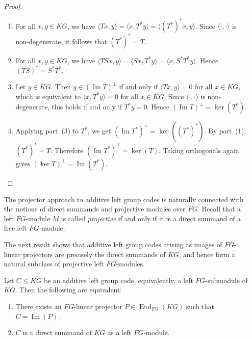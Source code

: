 \documentclass[11pt]{article}
\begin{document}
\begin{proof}
\begin{enumerate}
    \item For all $x,y\in KG$, we have $\langle Tx,y\rangle=\langle x,T^\ast y\rangle=\langle (T^\ast)^\ast x,y\rangle$. Since $\langle\cdot,\cdot\rangle$ is non-degenerate, it follows that $(T^\ast)^\ast=T$.

    \item For all $x,y\in KG$, we have
    $\langle TSx,y\rangle=\langle Sx,T^\ast y\rangle=\langle x,S^\ast T^\ast y\rangle$.
    Hence $(TS)^\ast=S^\ast T^\ast$.

    \item Let $y\in KG$. Then $y\in (\operatorname{Im}T)^\perp$ if and only if $\langle Tx,y\rangle=0$ for all $x\in KG$, which is equivalent to $\langle x,T^\ast y\rangle=0$ for all $x\in KG$. Since $\langle\cdot,\cdot\rangle$ is non-degenerate, this holds if and only if $T^\ast y=0$. Hence $(\operatorname{Im}T)^\perp=\ker(T^\ast)$.

    \item Applying part~(3) to $T^\ast$, we get $(\operatorname{Im}T^\ast)^\perp=\ker((T^\ast)^\ast)$. By part~(1), $(T^\ast)^\ast=T$. Therefore $(\operatorname{Im}T^\ast)^\perp=\ker(T)$. Taking orthogonals again gives $(\ker T)^\perp=\operatorname{Im}(T^\ast)$.
\end{enumerate}
\end{proof}

The projector approach to additive left group codes is naturally connected with the notions of direct summands and projective modules over $FG$. Recall that a left $FG$-module $M$ is called \textit{projective} if and only if it is a direct summand of a free left $FG$-module.

The next result shows that additive left group codes arising as images of $FG$-linear projectors are precisely the direct summands of $KG$, and hence form a natural subclass of projective left $FG$-modules.

\begin{proposition}\label{proj-summand}
Let $C\le KG$ be an additive left group code, equivalently, a left $FG$-submodule of $KG$. Then the following are equivalent:
\begin{enumerate}
    \item There exists an $FG$-linear projector $P\in\operatorname{End}_{FG}(KG)$ such that $C=\operatorname{Im}(P)$.
    \item $C$ is a direct summand of $KG$ as a left $FG$-module.
\end{enumerate}
\end{proposition}
\end{document}
